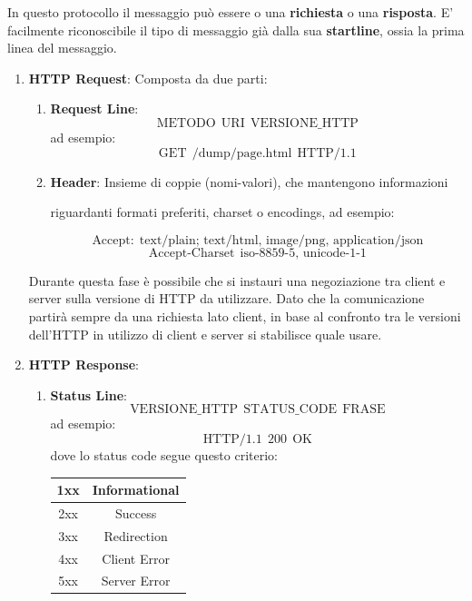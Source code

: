 \documentclass{article}
\begin{document}
In questo protocollo il messaggio può essere o una \textbf{richiesta} o una \textbf{risposta}.
E' facilmente riconoscibile il tipo di messaggio già dalla sua \textbf{startline}, ossia la prima linea del messaggio.

\begin{enumerate}
    \item \textbf{HTTP Request}: Composta da due parti:
    \begin{enumerate}
        \item \textbf{Request Line}:
        \[ \boxed{\text{METODO} \:\: \text{URI} \:\: \text{VERSIONE\_HTTP}} \]
        ad esempio:
        \[ \text{GET} \:\: \text{/dump/page.html} \:\: \text{HTTP/1.1} \]
        \item \textbf{Header}: Insieme di coppie (nomi-valori), che mantengono informazioni 
        
        riguardanti formati preferiti, charset o encodings, ad esempio:

        \[ \text{Accept:} \:\: \text{text/plain; text/html, image/png, application/json} \]
        \[ \text{Accept-Charset} \:\: \text{iso-8859-5, unicode-1-1} \]

    \end{enumerate}

    Durante questa fase è possibile che si instauri una negoziazione tra client e server sulla versione di HTTP da utilizzare. Dato che la comunicazione
    partirà sempre da una richiesta lato client, in base al confronto tra le versioni dell'HTTP in utilizzo di client e server si stabilisce quale usare.
    \item \textbf{HTTP Response}:
    \begin{enumerate}
        \item \textbf{Status Line}:
        \[ \boxed{\text{VERSIONE\_HTTP} \:\: \text{STATUS\_CODE} \:\: \text{FRASE}} \]
        ad esempio:
        \[ \text{HTTP/1.1} \:\: \text{200} \:\: \text{OK} \]
        \vspace*{5px}
        dove lo status code segue questo criterio:
        \vspace*{5px}

        \begin{center}
        \begin{tabular}{ |c|c| } 
        \hline
        1xx & Informational \\ 
        \hline
        2xx & Success \\ 
        \hline
        3xx & Redirection \\ 
        \hline
        4xx & Client Error \\ 
        \hline
        5xx & Server Error \\ 
        \hline
        \end{tabular}
        \end{center}


\end{enumerate}
\end{enumerate}
\end{document}
